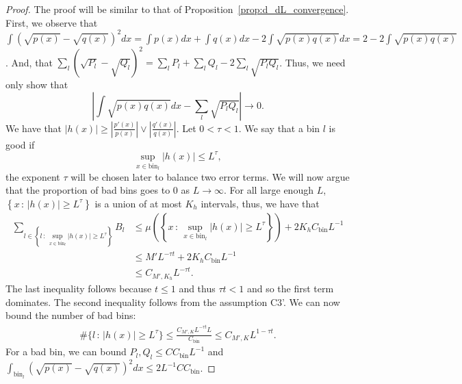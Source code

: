 \documentclass{article}
\newcommand{\bin}{\text{bin}}
\begin{document}
\begin{proof}
The proof will be similar to that of Proposition~\ref{prop:d_dL_convergence}.  First, we observe that $\int (\sqrt{p(x)} - \sqrt{q(x)})^2 dx = \int p(x) dx + \int q(x) dx - 2 \int \sqrt{p(x)q(x)} dx = 2 - 2 \int \sqrt{p(x)q(x)}$. And, that $\sum_l (\sqrt{P_l} - \sqrt{Q_l})^2 = \sum_l P_l + \sum_l Q_l - 2 \sum_l \sqrt{P_l Q_l}$. Thus, we need only show that 
\[
\left| \int \sqrt{p(x)q(x)} dx - \sum_l \sqrt{P_l Q_l} \right| \rightarrow 0.
\]
We have that $|h(x)| \geq \left| \frac{p'(x)}{p(x)} \right| \vee \left| \frac{q'(x)}{q(x)} \right|$. Let $0 < \tau < 1$. We say that a bin $l$ is good if
$$
\sup_{x \in \bin_l} |h(x)| \leq L^\tau,
$$
the exponent $\tau$ will be chosen later to balance two error terms. We will now argue that the proportion of bad bins goes to 0 as $L \rightarrow \infty$. For all large enough $L$, $\left \{x \,:\, |h(x)|  \geq L^\tau \right \}$ is a union of at most $K_h$ intervals, thus, we have that
\begin{align*}
\sum_{l \in \left \{ l \,:\, \sup_{x \in \bin_l} |h(x)| 
           \geq L^\tau \right \}}  B_l &\leq 
   \mu \left( \left\{x \,:\, \sup_{x \in \bin_l} |h(x)|
         \geq L^\tau \right\} \right) + 2 K_h C_\bin L^{-1} \\
  &\leq M' L^{-\tau t}  + 2K_h C_\bin L^{-1} \\
  & \leq C_{M', K_h} L^{ - \tau t}.  
\end{align*}
The last inequality follows because $t \leq 1$ and thus $\tau t < 1$ and so the first term dominates. The second inequality follows from the assumption C3'. We can now bound the number of bad bins: 
\begin{align*}
\# \{ l \,:\, |h(x)| \geq L^\tau \} \leq \frac{C_{M', K} L^{- \tau t} L}{C_\bin}  \leq C_{M',K} L^{1 - \tau t}.
\end{align*}
For a bad bin, we can bound $P_l, Q_l \leq C C_\bin L^{-1}$ and $\int_{\bin_l} (\sqrt{p(x)} - \sqrt{q(x)})^2 dx \leq 2 L^{-1} C C_\bin  $.


\end{proof}
\end{document}
